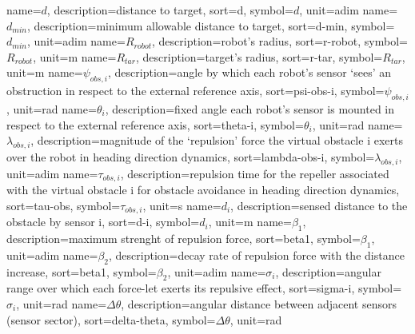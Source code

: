 %
{
  name={\ensuremath{d}},
  description={distance to target},
  sort=d,
  symbol={\ensuremath{d}},
  unit={adim}
}
%
{
  name={\ensuremath{d_{min}}},
  description={minimum allowable distance to target},
  sort=d-min,
  symbol={\ensuremath{d_{min}}},
  unit={adim}
}
%
{
  name={\ensuremath{R_{robot}}},
  description={robot's radius},
  sort=r-robot,
  symbol={\ensuremath{R_{robot}}},
  unit={m}
}
%
{
  name={\ensuremath{R_{tar}}},
  description={target's radius},
  sort=r-tar,
  symbol={\ensuremath{R_{tar}}},
  unit={m}
}
%
{
  name={\ensuremath{\psi_{obs,i}}},
  description={angle by which each robot's sensor `sees' an obstruction in
    respect to the external reference axis},
  sort=psi-obs-i,
  symbol={\ensuremath{\psi_{obs,i}}},
  unit={\si{rad}}
}
%
{
  name={\ensuremath{\theta_{i}}},
  description={fixed angle each robot's sensor is mounted in
    respect to the external reference axis},
  sort=theta-i,
  symbol={\ensuremath{\theta_{i}}},
  unit={\si{rad}}
}
%
{
  name={\ensuremath{\lambda_{obs,i}}},
  description={magnitude of the `repulsion' force the virtual obstacle i exerts
    over the robot in heading direction dynamics},
  sort=lambda-obs-i,
  symbol={\ensuremath{\lambda_{obs,i}}},
  unit={adim}
}
%
{
  name={\ensuremath{\tau_{obs,i}}},
  description={repulsion time for the repeller associated with the virtual
    obstacle i for obstacle avoidance in
    heading direction dynamics},
  sort=tau-obs,
  symbol={\ensuremath{\tau_{obs,i}}},
  unit={\si{s}}
}
%
{
  name={\ensuremath{d_{i}}},
  description={sensed distance to the obstacle by sensor i},
  sort=d-i,
  symbol={\ensuremath{d_{i}}},
  unit={m}
}
%
{
  name={\ensuremath{\beta_{1}}},
  description={maximum strenght of repulsion force},
  sort=beta1,
  symbol={\ensuremath{\beta_{1}}},
  unit={adim}
}
%
{
  name={\ensuremath{\beta_{2}}},
  description={decay rate of repulsion force with the distance increase},
  sort=beta1,
  symbol={\ensuremath{\beta_{2}}},
  unit={adim}
}
%
{
  name={\ensuremath{\sigma_{i}}},
  description={angular range over which each force-let exerts its repulsive effect},
  sort=sigma-i,
  symbol={\ensuremath{\sigma_{i}}},
  unit={rad}
}
%
{
  name={\ensuremath{\Delta \theta}},
  description={angular distance between adjacent sensors (sensor sector)},
  sort=delta-theta,
  symbol={\ensuremath{\Delta \theta}},
  unit={\si{rad}}
}
